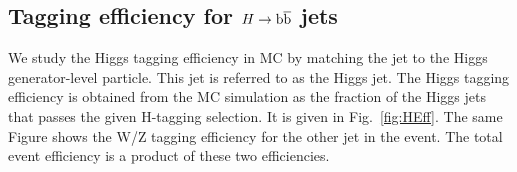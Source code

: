 










\subsection{Tagging efficiency for $H\to\mathrm{b\overline{b}}$ jets}


We study the Higgs tagging efficiency in MC by matching the jet to the Higgs 
generator-level particle.  This jet is referred to as the Higgs jet. 
The Higgs tagging efficiency is obtained from the MC simulation as the
fraction of the Higgs jets that passes the given H-tagging selection.
It is given in Fig.~\ref{fig:HEff}.  The same Figure shows the
W/Z tagging efficiency for the other jet in the event.  The total
event efficiency is a product of these two efficiencies.  

